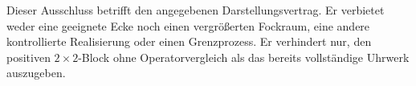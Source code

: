 Dieser Ausschluss betrifft den angegebenen Darstellungsvertrag. Er verbietet weder eine geeignete Ecke noch einen vergrößerten Fockraum, eine andere kontrollierte Realisierung oder einen Grenzprozess. Er verhindert nur, den positiven $2\times2$-Block ohne Operatorvergleich als das bereits vollständige Uhrwerk auszugeben.
